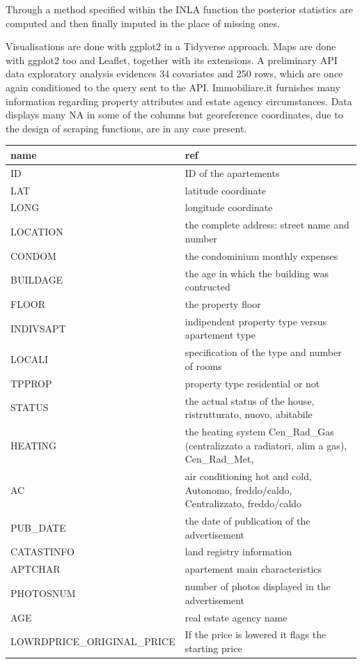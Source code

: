 \documentclass[
  12pt,
  a4paper,
  oneside]{book}
\theoremstyle{definition}
\theoremstyle{definition}
\theoremstyle{definition}
\theoremstyle{remark}
\begin{document}
Through a method specified within the INLA function the posterior statistics are computed and then finally imputed in the place of missing ones.

Visualisations are done with ggplot2 in a Tidyverse approach. Maps are done with ggplot2 too and Leaflet, together with its extensions.
A preliminary API data exploratory analysis evidences 34 covariates and 250 rows, which are once again conditioned to the query sent to the API. Immobiliare.it furnishes many information regarding property attributes and estate agency circumstances. Data displays many NA in some of the columns but georeference coordinates, due to the design of scraping functions, are in any case present.

\begin{longtable}{ll}
\toprule
name & ref\\
\midrule
ID & ID of the apartements\\
LAT & latitude coordinate\\
LONG & longitude coordinate\\
LOCATION & the complete address: street name and number\\
CONDOM & the condominium monthly expenses\\
\addlinespace
BUILDAGE & the age in which the building was contructed\\
FLOOR & the property floor\\
INDIVSAPT & indipendent property type versus apartement type\\
LOCALI & specification of the type and number of rooms\\
TPPROP & property type residential or not\\
\addlinespace
STATUS & the actual status of the house, ristrutturato, nuovo, abitabile\\
HEATING & the heating system Cen\_Rad\_Gas (centralizzato a radiatori, alim a gas), Cen\_Rad\_Met,\\
AC & air conditioning hot and cold, Autonomo, freddo/caldo, Centralizzato, freddo/caldo\\
PUB\_DATE & the date of publication of the advertisement\\
CATASTINFO & land registry information\\
\addlinespace
APTCHAR & apartement main characteristics\\
PHOTOSNUM & number of photos displayed in the advertisement\\
AGE & real estate agency name\\
LOWRDPRICE\_ORIGINAL\_PRICE & If the price is lowered it flags the starting price\\

\end{longtable}
\end{document}
